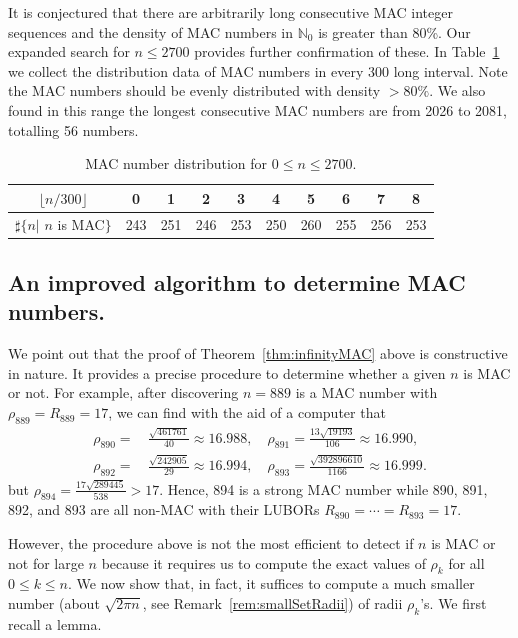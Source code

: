 \documentclass{article}
\theoremstyle{theorem}
\theoremstyle{definition}
\begin{document}
It is conjectured \cite[Conjecture 3, (4) and (6)]{Zhao2025Aug} that there are arbitrarily long consecutive MAC integer sequences and the density of MAC numbers in ${\mathbb N}_0$ is greater than 80\%. Our expanded search for $n\le 2700$ provides further confirmation of these. In Table~\ref{tbl:MACdistrution} we collect the distribution data of MAC numbers in every 300 long interval. Note the MAC numbers should be evenly distributed with density $> 80\%$. We also found in this range the longest consecutive MAC numbers are from 2026 to 2081, totalling 56 numbers.

\begin{table}[h]
\caption{MAC number distribution for $0\le n\le 2700$.}
\centering\begin{tabular}{|c|c|c|c|c|c|c|c|c|c|}
\hline
$\lfloor n/300 \rfloor$  &   0 &  1  & 2  & 3 & 4 & 5 & 6 & 7 & 8 \\
\hline
$\sharp\{n|$  $n$ is MAC$\}$ & 243& 251& 246& 253& 250& 260& 255& 256 & 253  \\
\hline
\end{tabular}
\label{tbl:MACdistrution}
\end{table}

\subsection{An improved algorithm to determine MAC numbers.}
We point out that the proof of Theorem~\ref{thm:infinityMAC} above is constructive in nature. It provides a precise procedure to determine whether a given $n$ is MAC or not.
For example, after discovering $n=889$ is a MAC number with $\rho_{889}=R_{889}=17$, we can find with the aid of a computer that
\begin{align*}
     \rho_{890}=&\,\tfrac{\sqrt{461761}}{40}\approx 16.988,\quad
     \rho_{891}=\tfrac{13\sqrt{19193}}{106}\approx 16.990,\\
     \rho_{892}=&\,\tfrac{\sqrt{242905}}{29}\approx 16.994,\quad
     \rho_{893}=\tfrac{\sqrt{392896610}}{1166}\approx 16.999.
\end{align*}
but $ \rho_{894}=\tfrac{17\sqrt{289445}}{538}>17$.
Hence, 894 is a strong MAC number while 890, 891, 892, and 893 are all non-MAC with their LUBORs $R_{890}=\cdots=R_{893}=17$.

However, the procedure above is not the most efficient to detect if $n$ is MAC or not for large $n$ because it requires us to compute the exact values of $\rho_k$ for all $0\le k\le n$. We now show that, in fact, it suffices to compute a much smaller number (about $\sqrt{2\pi n}$, see Remark~\ref{rem:smallSetRadii}) of radii $\rho_k$'s. We first recall a lemma.
\end{document}
